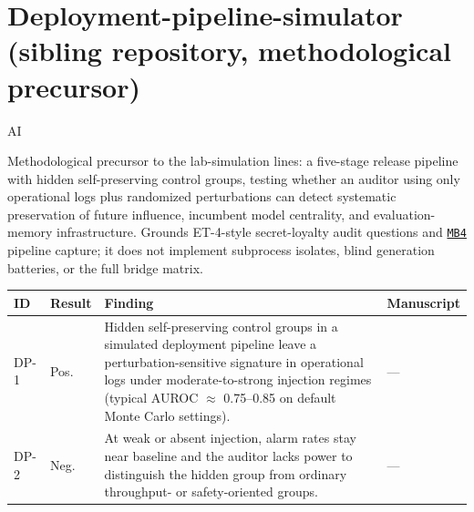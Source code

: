 \section{Deployment-pipeline-simulator (sibling repository, methodological precursor)}
\label{sec:appn-deployment-pipeline-simulator}
\begin{authbar}{AI}

Methodological precursor to the lab-simulation lines: a five-stage release pipeline with hidden self-preserving control groups, testing whether an auditor using only operational logs plus randomized perturbations can detect systematic preservation of future influence, incumbent model centrality, and evaluation-memory infrastructure. Grounds ET-4-style secret-loyalty audit questions and \hyperref[appbridge-crosswalk]{\texttt{MB4}} pipeline capture; it does not implement subprocess isolates, blind generation batteries, or the full bridge matrix.

\small
\setlength{\tabcolsep}{3pt}
\renewcommand{\arraystretch}{1.2}
\end{authbar}
\begin{longtable}{@{}L{0.05\textwidth}L{0.08\textwidth}L{0.55\textwidth}L{0.255\textwidth}@{}}
\toprule
\textbf{ID} & \textbf{Result} & \textbf{Finding} & \textbf{Manuscript} \\
\midrule
\endhead
\bottomrule
\endfoot
\label{finding:dp-1}DP-1 & Pos. & Hidden self-preserving control groups in a simulated deployment pipeline leave a perturbation-sensitive signature in operational logs under moderate-to-strong injection regimes (typical AUROC $\approx$ 0.75--0.85 on default Monte Carlo settings). & --- \\
\label{finding:dp-2}DP-2 & Neg. & At weak or absent injection, alarm rates stay near baseline and the auditor lacks power to distinguish the hidden group from ordinary throughput- or safety-oriented groups. & --- \\
\end{longtable}
\normalsize
\renewcommand{\arraystretch}{1.0}

\authbarneedspace
